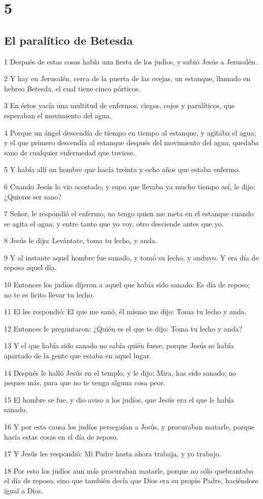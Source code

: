 \chapter{5}

\section*{El paralítico de Betesda}

\par 1 Después de estas cosas había una fiesta de los judíos, y subió Jesús a Jerusalén.
\par 2 Y hay en Jerusalén, cerca de la puerta de las ovejas, un estanque, llamado en hebreo Betesda, el cual tiene cinco pórticos.
\par 3 En éstos yacía una multitud de enfermos, ciegos, cojos y paralíticos, que esperaban el movimiento del agua.
\par 4 Porque un ángel descendía de tiempo en tiempo al estanque, y agitaba el agua; y el que primero descendía al estanque después del movimiento del agua, quedaba sano de cualquier enfermedad que tuviese.
\par 5 Y había allí un hombre que hacía treinta y ocho años que estaba enfermo.
\par 6 Cuando Jesús lo vio acostado, y supo que llevaba ya mucho tiempo así, le dijo: ¿Quieres ser sano?
\par 7 Señor, le respondió el enfermo, no tengo quien me meta en el estanque cuando se agita el agua; y entre tanto que yo voy, otro desciende antes que yo.
\par 8 Jesús le dijo: Levántate, toma tu lecho, y anda.
\par 9 Y al instante aquel hombre fue sanado, y tomó su lecho, y anduvo. Y era día de reposo aquel día.
\par 10 Entonces los judíos dijeron a aquel que había sido sanado: Es día de reposo; no te es lícito llevar tu lecho.
\par 11 El les respondió: El que me sanó, él mismo me dijo: Toma tu lecho y anda.
\par 12 Entonces le preguntaron: ¿Quién es el que te dijo: Toma tu lecho y anda?
\par 13 Y el que había sido sanado no sabía quién fuese, porque Jesús se había apartado de la gente que estaba en aquel lugar.
\par 14 Después le halló Jesús en el templo, y le dijo: Mira, has sido sanado; no peques más, para que no te venga alguna cosa peor.
\par 15 El hombre se fue, y dio aviso a los judíos, que Jesús era el que le había sanado.
\par 16 Y por esta causa los judíos perseguían a Jesús, y procuraban matarle, porque hacía estas cosas en el día de reposo.
\par 17 Y Jesús les respondió: Mi Padre hasta ahora trabaja, y yo trabajo.
\par 18 Por esto los judíos aun más procuraban matarle, porque no sólo quebrantaba el día de reposo, sino que también decía que Dios era su propio Padre, haciéndose igual a Dios.

